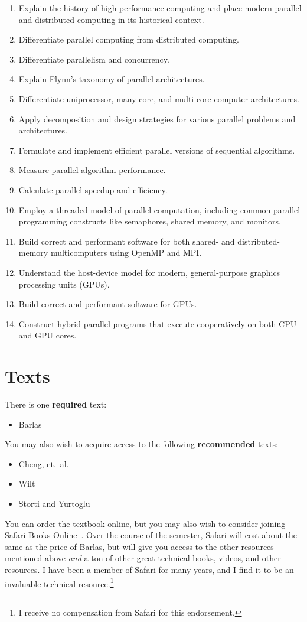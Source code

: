 \documentclass[11pt]{article}
\begin{document}
\begin{enumerate}
\item Explain the history of high-performance computing
  and place modern parallel and distributed computing
  in its historical context.
\item Differentiate parallel computing
  from distributed computing.
\item Differentiate parallelism and concurrency.
\item Explain Flynn's taxonomy of parallel architectures.
\item Differentiate uniprocessor, many-core, and multi-core computer architectures.
\item Apply decomposition and design strategies
  for various parallel problems and architectures.
\item Formulate and implement efficient parallel versions of sequential algorithms.
\item Measure parallel algorithm performance.
\item Calculate parallel speedup and efficiency.
\item Employ a threaded model of parallel computation,
  including common parallel programming constructs
  like semaphores, shared memory, and monitors.
\item Build correct and performant software
  for both shared- and distributed-memory multicomputers
  using OpenMP and MPI.
\item Understand the host-device model
  for modern, general-purpose graphics processing units (GPUs).
\item Build correct and performant software for GPUs.
\item Construct hybrid parallel programs
  that execute cooperatively on both CPU and GPU cores.
\end{enumerate}

\section{Texts}

There is one \textbf{required} text:
\begin{itemize}
\item Barlas~\cite{barlas2014multicore}
\end{itemize}
You may also wish to acquire access to the following \textbf{recommended} texts:
\begin{itemize}
\item Cheng, et.\ al.~\cite{cheng2014professional}
\item Wilt~\cite{wilt2013cuda}
\item Storti and Yurtoglu~\cite{storti2015cuda}
\end{itemize}
You can order the textbook online,
but you may also wish to consider joining Safari Books Online~\cite{safari}.
Over the course of the semester,
Safari will cost about the same as the price of Barlas,
but will give you access to the other resources mentioned above
\emph{and} a ton of other great technical books, videos, and other resources.
I have been a member of Safari for many years,
and I find it to be an invaluable technical resource.\footnote{I receive no compensation
  from Safari for this endorsement.}
\end{document}
